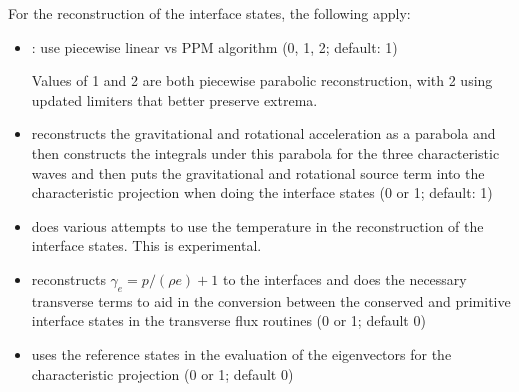 For the reconstruction of the interface states, the following apply:
\begin{itemize}
\item {}: use piecewise linear vs PPM algorithm
  (0, 1, 2; default: 1)

  Values of 1 and 2 are both piecewise parabolic reconstruction, with
  2 using updated limiters that better preserve extrema.

\item {} reconstructs the gravitational
  and rotational acceleration as a parabola and then constructs the
  integrals under this parabola for the three characteristic waves and
  then puts the gravitational and rotational source term into the
  characteristic projection when doing the interface states (0 or 1;
  default: 1)

\item {} does various attempts to use the
  temperature in the reconstruction of the interface states.  This
  is experimental.

\item {} reconstructs $\gamma_e = p/(\rho e) + 1$
  to the interfaces and does the necessary transverse terms to aid in
  the conversion between the conserved and primitive interface states
  in the transverse flux routines (0 or 1; default 0)

\item {} uses the reference states in
  the evaluation of the eigenvectors for the characteristic projection
  (0 or 1; default 0)
\end{itemize}




